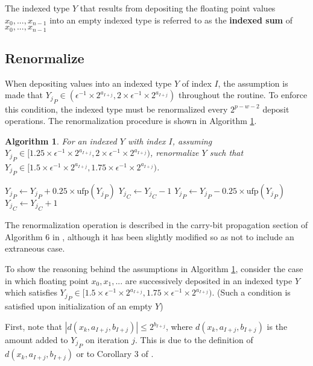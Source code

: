 \documentclass[12pt]{article}
\providecommand{\ufp}{\ensuremath{\text{ufp}}}
\theoremstyle{plain}
\newtheorem{alg}{Algorithm}[section]
\begin{document}
    The indexed type $Y$ that results from depositing the floating point values $x_0, ..., x_{n - 1}$ into an empty indexed type is referred to as the \textbf{indexed sum} of $x_0, ..., x_{n - 1}$

  \subsection{Renormalize}
    \label{sec:renormalize}
    When depositing values into an indexed type $Y$ of index $I$, the assumption is made that ${Y_j}_P \in (\epsilon^{-1}\times 2^{a_{I + j}}, 2 \times \epsilon^{-1}\times 2^{a_{I + j}})$ throughout the routine. To enforce this condition, the indexed type must be renormalized every $2^{p - w - 2}$ deposit operations. The renormalization procedure is shown in Algorithm \ref{alg:renorm}.
    \begin{alg}
      For an indexed $Y$ with index $I$, assuming ${Y_j}_P \in [1.25 \times \epsilon^{-1}\times 2^{a_{I + j}}, 2 \times \epsilon^{-1}\times 2^{a_{I + j}})$, renormalize $Y$ such that ${Y_j}_P \in [1.5 \times \epsilon^{-1}\times 2^{a_{I + j}}, 1.75 \times \epsilon^{-1}\times 2^{a_{I + j}})$.
      \begin{algorithmic}
            \If{${Y_j}_P < 1.5 \times \ufp({Y_j}_P)$}
              \State ${Y_j}_P \gets {Y_j}_P + 0.25 \times \ufp({Y_j}_P)$
              \State ${Y_j}_C \gets {Y_j}_C - 1$
            \EndIf
            \If{${Y_j}_P \geq 1.75 \times \ufp({Y_j}_P)$}
              \State ${Y_j}_P \gets {Y_j}_P - 0.25 \times \ufp({Y_j}_P)$
              \State ${Y_j}_C \gets {Y_j}_C + 1$
            \EndIf
          \EndFor
        \EndFunction
      \end{algorithmic}
      \label{alg:renorm}
    \end{alg}
    The renormalization operation is described in the carry-bit propagation section of Algorithm $6$ in \cite{repsum}, although it has been slightly modified so as not to include an extraneous case.

    To show the reasoning behind the assumptions in Algorithm \ref{alg:renorm}, consider the case in which floating point $x_0, x_1, ...$ are successively deposited in an indexed type $Y$ which satisfies ${Y_j}_P \in [1.5 \times \epsilon^{-1}\times 2^{a_{I + j}}, 1.75 \times \epsilon^{-1}\times 2^{a_{I + j}})$. (Such a condition is satisfied upon initialization of an empty $Y$)

    First, note that $|d(x_k, a_{I + j}, b_{I + j})| \leq 2^{b_{I + j}}$, where $d(x_k, a_{I + j}, b_{I + j})$ is the amount added to ${Y_j}_P$ on iteration $j$. This is due to the definition of $d(x_k, a_{I+j}, b_{I + j})$ or to Corollary 3 of \cite{repsum}.
\end{document}
